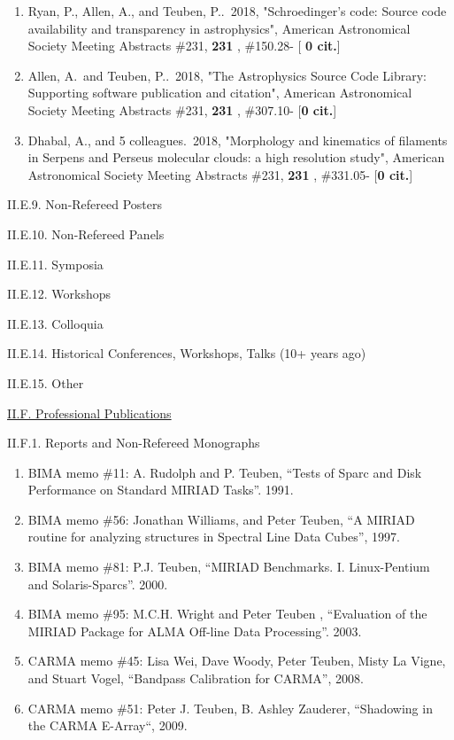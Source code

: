 \documentclass[11pt,letterpaper]{article}
\newcommand{\rsquo}{'}
\begin{document}
\begin{enumerate}[resume,label=\textbf{\arabic*}.]
\item  
Ryan, P., Allen, A., and Teuben, P..\  2018,  "Schroedinger{\rsquo}s code: 
Source code availability and transparency in astrophysics", American 
Astronomical Society Meeting Abstracts \#231,  {\bf 231} , \#150.28- [{\bf 
0 cit.}] 

\item  
Allen, A.~and Teuben, P..\  2018,  "The Astrophysics Source Code Library: 
Supporting software publication and citation", American Astronomical 
Society Meeting Abstracts \#231,  {\bf 231} , \#307.10- [{\bf 0 cit.}]

\item  
Dhabal, A., and 5 colleagues.\  2018,  "Morphology and kinematics of 
filaments in Serpens and Perseus molecular clouds: a high resolution 
study", American Astronomical Society Meeting Abstracts \#231,  {\bf 231} , 
\#331.05- [{\bf 0 cit.}] 

  
\end{enumerate}

II.E.9. Non-Refereed Posters


II.E.10. Non-Refereed Panels

II.E.11. Symposia

II.E.12. Workshops

II.E.13. Colloquia

II.E.14. Historical Conferences, Workshops, Talks (10+ years ago)

II.E.15. Other


\underline{II.F. Professional Publications}

II.F.1. Reports and Non-Refereed Monographs


\begin{enumerate}[resume,label=\textbf{\arabic*}.]  
\item
BIMA memo \#11: A. Rudolph and P. Teuben,
``Tests of Sparc and Disk Performance on Standard MIRIAD Tasks''. 1991.

\item
BIMA memo \#56: Jonathan Williams, and Peter Teuben,
``A MIRIAD routine for analyzing structures in Spectral Line Data Cubes'', 1997.

\item
BIMA memo \#81: P.J. Teuben,
``MIRIAD Benchmarks. I. Linux-Pentium and Solaris-Sparcs''. 2000.

\item
BIMA memo \#95: M.C.H. Wright and Peter Teuben ,
``Evaluation of the MIRIAD Package for ALMA Off-line Data Processing''. 2003.

\item
CARMA memo \#45:  Lisa Wei, Dave Woody, Peter Teuben, Misty La Vigne, and Stuart Vogel,
``Bandpass Calibration for CARMA'', 2008.

\item
CARMA memo \#51: Peter J. Teuben, B. Ashley Zauderer,
``Shadowing in the CARMA E-Array``, 2009.
\end{enumerate}
               
\end{document}
